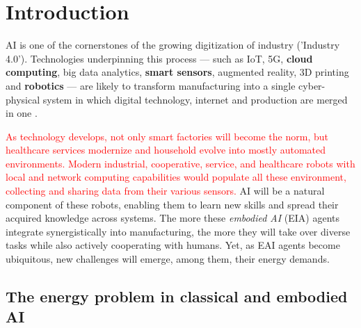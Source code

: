 \section{Introduction}\label{sec:intro}
\begin{fancyquotes}
	AI is one of the cornerstones of the growing digitization of industry ('Industry 4.0'). Technologies underpinning  this  process  ---  such as IoT,  5G,  \textbf{cloud  computing},  big  data  analytics,  \textbf{smart  sensors},  augmented  reality,  3D  printing  and  \textbf{robotics}  ---  are  likely  to  transform  manufacturing  into  a  single cyber-physical  system  in which digital  technology,  internet  and  production  are merged in one \cite{szczepanski_2019}.
\end{fancyquotes}
\textcolor{red}{As technology develops, not only smart factories will become the norm, but healthcare services modernize and household evolve into mostly automated environments. Modern industrial, cooperative, service, and healthcare robots with local and network computing capabilities would populate all these environment, collecting and sharing data from their various sensors.} AI will be a natural component of these robots, enabling them to learn new skills and spread their acquired knowledge across systems. The more these \emph{embodied AI} (EIA) agents integrate synergistically into manufacturing, the more they will take over diverse tasks while also actively cooperating with humans. Yet, as EAI agents become ubiquitous, new challenges will emerge, among them, their energy demands.

\subsection{The energy problem in classical and embodied AI}

